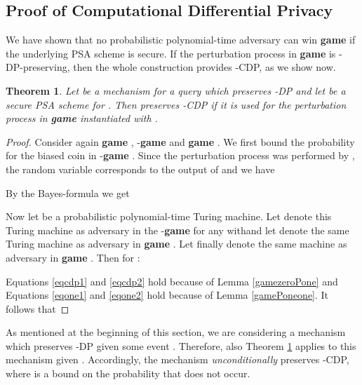 \documentclass[10pt]{extarticle}
\newtheorem{Thm}{Theorem}
\begin{document}
\subsection{Proof of Computational Differential Privacy}

We have shown that no probabilistic polynomial-time adversary can win \textbf{game}  if the underlying PSA scheme is secure. If the perturbation process in \textbf{game}  is -{\sffamily DP}-preserv\-ing, then the whole construction provides -{\sffamily CDP}, as we show now.

\begin{Thm}\label{cdptheorem} Let  be a mechanism for a query  which preserves -\mbox{\upshape\sffamily DP} and let  be a secure PSA scheme for . Then  preserves -\mbox{\upshape\sffamily CDP} if it is used for the perturbation process in \textbf{\upshape game } instantiated with .
\end{Thm}
\begin{proof} Consider again \textbf{game} , -\textbf{game}  and \textbf{game} . We first bound the probability  for the biased coin in -\textbf{game} . Since the perturbation process was performed by , the random variable  corresponds to the output of  and we have

By the Bayes-formula we get

Now let  be a probabilistic polynomial-time Turing machine. Let  denote this Turing machine as adversary in the -\textbf{game}  for any  with\linebreak  and let  denote the same Turing machine as adversary in \textbf{game} . Let finally  denote the same machine as adversary in \textbf{game} . Then for :

Equations \eqref{eqcdp1} and \eqref{eqcdp2} hold because of Lemma \ref{gamezeroPone} and Equations \eqref{eqone1} and \eqref{eqone2} hold because of Lemma \ref{gamePoneone}. 
It follows that

\end{proof}

As mentioned at the beginning of this section, we are considering a mechanism which preserves -\mbox{\upshape\sffamily DP} given some event . Therefore, also Theorem \ref{cdptheorem} applies to this mechanism given . Accordingly, the mechanism \textit{unconditionally} preserves -\mbox{\upshape\sffamily CDP}, where  is a bound on the probability that  does not occur.
\end{document}
